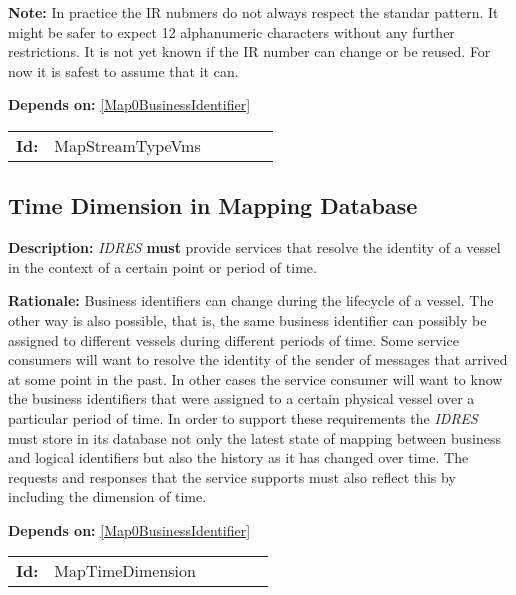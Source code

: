 \textbf{Note:} In practice the IR nubmers do not always respect the standar pattern. It might be safer to expect 12 alphanumeric characters without any further  restrictions. It is not yet known if the IR number can change or be reused.  For now it is safest to assume that it can.

\textbf{Depends on:} \ref{Map0BusinessIdentifier} 

\par
{\small \begin{center}\begin{tabular}{rlrlrl}
\textbf{Id:} & MapStreamTypeVms  & & & \end{tabular}\end{center} }

\subsection{Time Dimension in Mapping Database}\label{MapTimeDimension}
\textbf{Description:} \textsl{IDRES} \textbf{must} provide services that resolve  the identity of a vessel in the context of a certain point or period of time.

\textbf{Rationale:} Business identifiers can change during the lifecycle of a vessel. The other way is also possible, that is, the same business identifier  can possibly be assigned to different vessels during different periods of  time. Some service consumers will want to resolve the identity of the sender  of messages that arrived at some point in the past. In other cases the  service consumer will want to know the business identifiers that were assigned to a certain physical vessel over a particular period of time.  In order to support these requirements the \textsl{IDRES} must store in its  database not only the latest state of mapping between business and logical identifiers but also the history as it has changed over time. The requests and responses that the service supports must also reflect this by including the dimension of time.

\textbf{Depends on:} \ref{Map0BusinessIdentifier} 

\par
{\small \begin{center}\begin{tabular}{rlrlrl}
\textbf{Id:} & MapTimeDimension  & & & \end{tabular}\end{center} }


